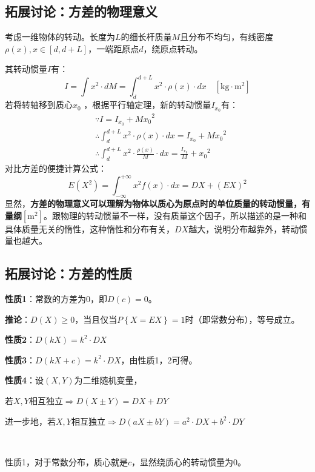 \subsection{拓展讨论：方差的物理意义}

考虑一维物体的转动。长度为$L$的细长杆质量$M$且分布不均匀，有线密度$\rho \left( x \right) ,x\in \left[ d,d+L \right] $，一端距原点$d$，绕原点转动。

其转动惯量$I$有：
\[
I=\int{x^2\cdot dM}=\int_d^{d+L}{x^2\cdot \rho \left( x \right) \cdot dx} \quad \left[ \mathrm{kg}\cdot \mathrm{m}^2 \right]
\]
若将转轴移到质心$x_0$ ，根据平行轴定理，新的转动惯量$I_{x_0}$有：
\begin{align*}
&\because I=I_{x_0}+{Mx_0}^2 \\
&\therefore \int_d^{d+L}{x^2\cdot \rho \left( x \right) \cdot dx}=I_{x_0}+{Mx_0}^2 \\
&\therefore \int_d^{d+L}{x^2\cdot \frac{\rho \left( x \right)}{M}\cdot dx}=\frac{I_{x_0}}{M}+{x_0}^2
\end{align*}
对比方差的便捷计算公式：
\[
E\left( X^2 \right) =\int_{-\infty}^{+\infty}{x^2f\left( x \right) \cdot dx}=DX+\left( EX \right) ^2
\]
显然，{\bf 方差的物理意义可以理解为物体以质心为原点时的单位质量的转动惯量，有量纲$\left[ \mathrm{m}^2 \right] $}。跟物理的转动惯量不一样，没有质量这个因子，所以描述的是一种和具体质量无关的惰性，这种惰性和分布有关，$DX$越大，说明分布越靠外，转动惯量也越大。

\subsection{拓展讨论：方差的性质}

{\bf 性质1}：常数的方差为0，即$D\left( c \right) =0$。

{\bf 推论}：$D\left( X \right) \geqslant 0$，当且仅当$P\left\{ X=EX \right\} =1$时（即常数分布），等号成立。

{\bf 性质2}：$D\left( kX \right) =k^2\cdot DX$

{\bf 性质3}：$D\left( kX+c \right) =k^2\cdot DX$，由性质1，2可得。

{\bf 性质4}：设$\left( X,Y \right) $为二维随机变量，

若$X,Y$相互独立$\Rightarrow D\left( X\pm Y \right) =DX+DY$

进一步地，若$X,Y$相互独立$\Rightarrow D\left( aX\pm bY \right) =a^2\cdot DX+b^2\cdot DY$

~

性质1，对于常数分布，质心就是$c$，显然绕质心的转动惯量为0。

